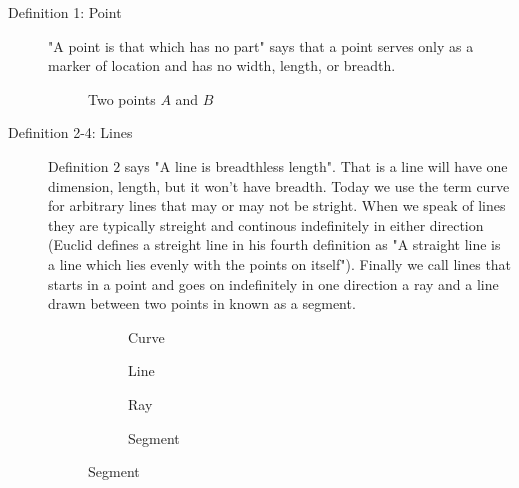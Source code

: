 \begin{description}
\item [Definition 1: Point] "A point is that which has no part" says that a point serves only as a marker of location and has no width, length, or breadth.
\begin{figure}[H]
\centering
{}
\caption{Two points $A$ and $B$}
\end{figure}

\item [Definition 2-4: Lines] Definition $2$ says "A line is breadthless length". That is a line will have one dimension, length, but it won’t have breadth. Today we use the term curve for arbitrary lines that may or may not be stright. When we speak of lines they are typically streight and continous indefinitely in either direction (Euclid defines a streight line in his fourth definition as "A straight line is a line which lies evenly with the points on itself"). Finally we call lines that starts in a point and goes on indefinitely in one direction a ray and a line drawn between two points in known as a segment.
\begin{figure}[H]
\begin{subfigure}[b]{0.2\textwidth}
    \caption{Curve}
\end{subfigure}
%
\begin{subfigure}[b]{0.3\textwidth}
    \caption{Line}
\end{subfigure}
%
\begin{subfigure}[b]{0.25\textwidth}
    \caption{Ray}
\end{subfigure}
%
\begin{subfigure}[b]{0.2\textwidth}
    \caption{Segment}
\end{subfigure}
\end{figure}


\end{description}
